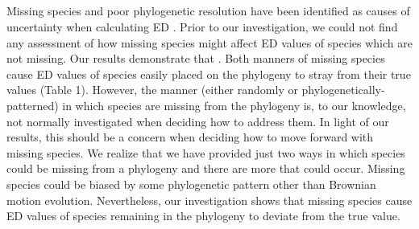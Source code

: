 \documentclass[12pt,english]{article}
\begin{document}
\subsection*{}
Missing species and poor phylogenetic resolution have been identified as causes
of uncertainty when calculating ED \autocite{Isaac2007}. Prior to our
investigation, we could not find any assessment of how missing species might
affect ED values of species which are not missing.
Our results demonstrate that .
Both manners of missing species cause ED values of species easily
placed on the phylogeny to stray from their true values (Table
1).
 However, the manner (either
randomly or phylogenetically-patterned) in which species are missing
from the phylogeny is, to our knowledge, not normally investigated
when deciding how to address them. In light of our results, this
should be a concern when deciding how to move forward with missing
species.
We realize that we have provided just two ways in which
species could be missing from a phylogeny and there are more that
could occur. Missing species could be biased by some phylogenetic
pattern other than Brownian motion evolution. Nevertheless, our
investigation shows that missing species cause ED values of species
remaining in the phylogeny to deviate from the true value.
\end{document}
